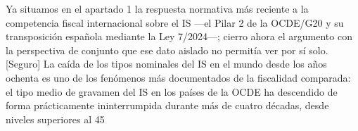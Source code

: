 \documentclass[10pt,a4paper]{article}
\begin{document}
Ya situamos en el apartado 1 la respuesta normativa más reciente a la competencia fiscal internacional sobre el IS —el Pilar 2 de la OCDE/G20 y su transposición española mediante la Ley 7/2024—; cierro ahora el argumento con la perspectiva de conjunto que ese dato aislado no permitía ver por sí solo. [Seguro] La caída de los tipos nominales del IS en el mundo desde los años ochenta es uno de los fenómenos más documentados de la fiscalidad comparada: el tipo medio de gravamen del IS en los países de la OCDE ha descendido de forma prácticamente ininterrumpida durante más de cuatro décadas, desde niveles superiores al 45%
\end{document}
